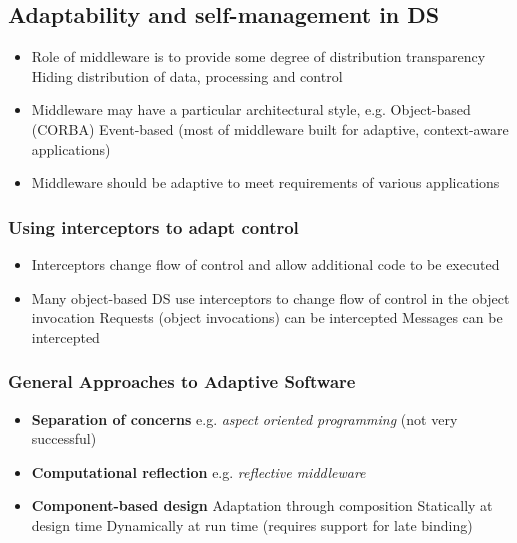 \subsection{Adaptability and self-management in DS}
\begin{itemize}
	\item Role of middleware is to provide some degree of distribution transparency
	\subitem Hiding distribution of data, processing and control
	\item Middleware may have a particular architectural style, e.g.
	\subitem Object-based (CORBA)
	\subitem Event-based (most of middleware built for adaptive, context-aware applications)
	\item Middleware should be adaptive to meet requirements of various applications	
\end{itemize}
\subsubsection{Using interceptors to adapt control}
\begin{itemize}
	\item Interceptors change flow of control and allow additional code to be executed
	\item Many object-based DS use interceptors to change flow of control in the object invocation
	\subitem Requests (object invocations) can be intercepted
	\subitem Messages can be intercepted	
\end{itemize}
\subsubsection{General Approaches to Adaptive Software}
\begin{itemize}
	\item\textbf{Separation of concerns}
	\subitem e.g. \textit{aspect oriented programming} (not very successful)
	\item\textbf{Computational reflection}
	\subitem e.g. \textit{reflective middleware}
	\item\textbf{Component-based design}
	\subitem Adaptation through composition
	\subsubitem Statically at design time
	\subsubitem Dynamically at run time (requires support for late binding)	
\end{itemize}

